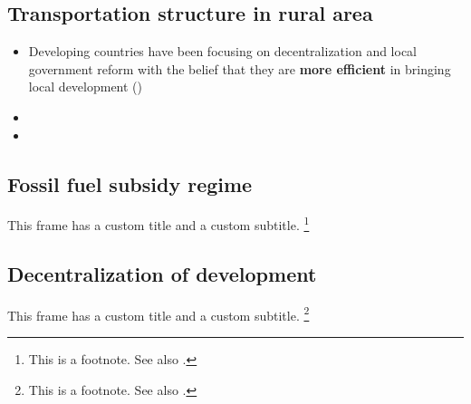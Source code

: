 \documentclass[
11pt,notheorems,compress,hyperref={pdfauthor=Maghfira Ramadhani}
]{beamer}
\begin{document}
\subsection{Transportation structure in rural area}
\begin{frame}
\begin{itemize}
    \item Developing countries have been focusing on decentralization and local government reform with the belief that they are \alert{\textbf{more efficient}} in bringing local development (\citet{vazquez_2017}) 
    \item 
    \item 
\end{itemize}
\end{frame}

\subsection{Fossil fuel subsidy regime}
\begin{frame}
    This frame has a custom title and a custom subtitle. \footnote{This is a footnote. See also \citet{hartojo_2022}. }
\end{frame}

\subsection{Decentralization of development}
\begin{frame}
    This frame has a custom title and a custom subtitle. \footnote{This is a footnote. See also \citep{hartojo_2022}. }
\end{frame}
\end{document}
